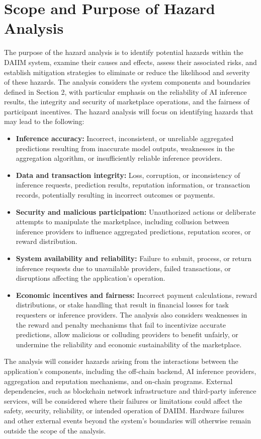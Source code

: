 \documentclass{article}
\begin{document}
\section{Scope and Purpose of Hazard Analysis}

The purpose of the hazard analysis is to identify potential hazards within the DAIIM system, examine their causes and effects, assess their associated risks, and establish mitigation strategies to eliminate or reduce the likelihood and severity of these hazards. The analysis considers the system components and boundaries defined in Section 2, with particular emphasis on the reliability of AI inference results, the integrity and security of marketplace operations, and the fairness of participant incentives.
The hazard analysis will focus on identifying hazards that may lead to the following:
\begin{itemize}
\item \textbf{Inference accuracy:} Incorrect, inconsistent, or unreliable aggregated predictions resulting from inaccurate model outputs, weaknesses in the aggregation algorithm, or insufficiently reliable inference providers.
\item \textbf{Data and transaction integrity:} Loss, corruption, or inconsistency of inference requests, prediction results, reputation information, or transaction records, potentially resulting in incorrect outcomes or payments.

\item \textbf{Security and malicious participation:} Unauthorized actions or deliberate attempts to manipulate the marketplace, including collusion between inference providers to influence aggregated predictions, reputation scores, or reward distribution.

\item \textbf{System availability and reliability:} Failure to submit, process, or return inference requests due to unavailable providers, failed transactions, or disruptions affecting the application's operation.

\item \textbf{Economic incentives and fairness:} Incorrect payment calculations, reward distributions, or stake handling that result in financial losses for task requesters or inference providers. The analysis also considers weaknesses in the reward and penalty mechanisms that fail to incentivize accurate predictions, allow malicious or colluding providers to benefit unfairly, or undermine the reliability and economic sustainability of the marketplace.

\end{itemize}
The analysis will consider hazards arising from the interactions between the application's components, including the off-chain backend, AI inference providers, aggregation and reputation mechanisms, and on-chain programs. External dependencies, such as blockchain network infrastructure and third-party inference services, will be considered where their failures or limitations could affect the safety, security, reliability, or intended operation of DAIIM. Hardware failures and other external events beyond the system's boundaries will otherwise remain outside the scope of the analysis.
\end{document}
